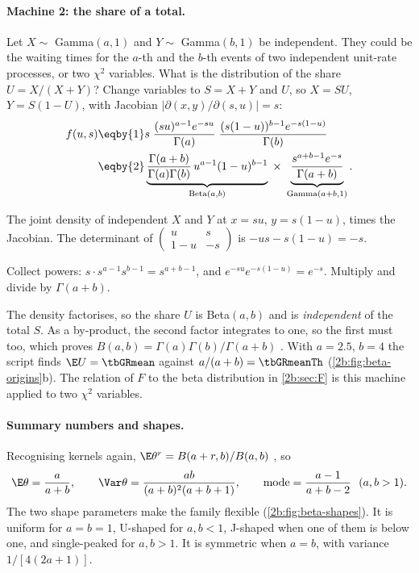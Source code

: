 \paragraph{Machine 2: the share of a total.} Let $X\sim$ Gamma$(a,1)$ and $Y\sim$ Gamma$(b,1)$ be independent. They could be the waiting times for the $a$-th and the $b$-th events of two independent unit-rate processes, or two $\chi^2$ variables. What is the distribution of the share $U=X/(X+Y)$? Change variables to $S=X+Y$ and $U$, so $X=SU$, $Y=S(1-U)$, with Jacobian $\bigl|\partial(x,y)/\partial(s,u)\bigr|=s$:
\begin{align}
  f(u,s)
  &\eqby{1}s\;\frac{(su)^{a-1}e^{-su}}{\Gamma(a)}\;\frac{(s(1-u))^{b-1}e^{-s(1-u)}}{\Gamma(b)} \nonumber\\
  &\eqby{2}\underbrace{\frac{\Gamma(a+b)}{\Gamma(a)\Gamma(b)}\,u^{a-1}(1-u)^{b-1}}_{\text{Beta}(a,b)}\;\times\;\underbrace{\frac{s^{a+b-1}e^{-s}}{\Gamma(a+b)}}_{\text{Gamma}(a+b,1)} .
  \label{2b:eq:gamma-ratio}
\end{align}
\begin{explain}
  \item The joint density of independent $X$ and $Y$ at $x=su$, $y=s(1-u)$, times the Jacobian. The determinant of $\begin{pmatrix}u&s\\1-u&-s\end{pmatrix}$ is $-us-s(1-u)=-s$.
  \item Collect powers: $s\cdot s^{a-1}s^{b-1}=s^{a+b-1}$, and $e^{-su}e^{-s(1-u)}=e^{-s}$. Multiply and divide by $\Gamma(a+b)$.
\end{explain}
The density factorises, so the share $U$ is Beta$(a,b)$ and is \emph{independent} of the total $S$. As a by-product, the second factor integrates to one, so the first must too, which proves $B(a,b)=\Gamma(a)\Gamma(b)/\Gamma(a+b)$ . With $a=2.5$, $b=4$ the script finds $\E U=\tbGRmean$ against $a/(a+b)=\tbGRmeanTh$ (\cref{2b:fig:beta-origins}b). The relation of $F$ to the beta distribution in \cref{2b:sec:F} is this machine applied to two $\chi^2$ variables.

\paragraph{Summary numbers and shapes.} Recognising kernels again, $\E\theta^r=B(a+r,b)/B(a,b)$ , so
\begin{equation}
  \E\theta=\frac{a}{a+b},\qquad \Var\theta=\frac{ab}{(a+b)^2(a+b+1)},\qquad \text{mode}=\frac{a-1}{a+b-2}\ \ (a,b>1).
  \label{2b:eq:beta-moments}
\end{equation}
The two shape parameters make the family flexible (\cref{2b:fig:beta-shapes}). It is uniform for $a=b=1$, U-shaped for $a,b<1$, J-shaped when one of them is below one, and single-peaked for $a,b>1$. It is symmetric when $a=b$, with variance $1/[4(2a+1)]$.

